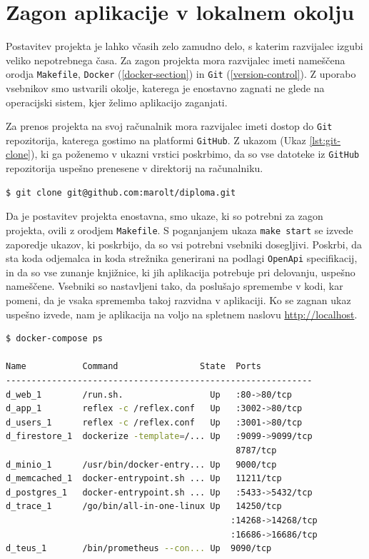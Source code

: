 \documentclass[a4paper, 12pt]{book}
\begin{document}
\section{Zagon aplikacije v lokalnem okolju}
Postavitev projekta je lahko včasih zelo zamudno delo, s katerim razvijalec izgubi veliko nepotrebnega časa. Za zagon projekta mora razvijalec imeti nameščena orodja \verb=Makefile=, \verb=Docker= (\ref{docker-section}) in \verb=Git= (\ref{version-control}). Z uporabo vsebnikov smo ustvarili okolje, katerega je enostavno zagnati ne glede na operacijski sistem, kjer želimo aplikacijo zaganjati.

Za prenos projekta na svoj računalnik mora razvijalec imeti dostop do \verb=Git= repozitorija, katerega gostimo na platformi \verb=GitHub=. Z ukazom (Ukaz \ref{lst:git-clone}), ki ga poženemo v ukazni vrstici poskrbimo, da so vse datoteke iz \verb=GitHub= repozitorija uspešno prenesene v direktorij na računalniku.

\begin{lstlisting}[language=bash,style=mystyle,caption={Ukaz za prenos datotek iz GitHub repozitorija},label=lst:git-clone]
$ git clone git@github.com:marolt/diploma.git
\end{lstlisting}

Da je postavitev projekta enostavna, smo ukaze, ki so potrebni za zagon projekta, ovili z orodjem \verb=Makefile=. S poganjanjem ukaza \verb=make start= se izvede zaporedje ukazov, ki poskrbijo, da so vsi potrebni vsebniki dosegljivi. Poskrbi, da sta koda odjemalca in koda strežnika generirani na podlagi \verb=OpenApi= specifikacij, in da so vse zunanje knjižnice, ki jih aplikacija potrebuje pri delovanju, uspešno nameščene. Vsebniki so nastavljeni tako, da poslušajo spremembe v kodi, kar pomeni, da je vsaka sprememba takoj razvidna v aplikaciji. Ko se zagnan ukaz uspešno izvede, nam je aplikacija na voljo na spletnem naslovu \url{http://localhost}.


\begin{lstlisting}[language=bash,style=mystyle,caption={Prikaz zagnanih vsebnikov.},label=lst:running-containers]
$ docker-compose ps

Name           Command                State  Ports
------------------------------------------------------------
d_web_1        /run.sh.                 Up   :80->80/tcp
d_app_1        reflex -c /reflex.conf   Up   :3002->80/tcp
d_users_1      reflex -c /reflex.conf   Up   :3001->80/tcp 
d_firestore_1  dockerize -template=/... Up   :9099->9099/tcp             
                                             8787/tcp
d_minio_1      /usr/bin/docker-entry... Up   9000/tcp     
d_memcached_1  docker-entrypoint.sh ... Up   11211/tcp     
d_postgres_1   docker-entrypoint.sh ... Up   :5433->5432/tcp       
d_trace_1      /go/bin/all-in-one-linux Up   14250/tcp 
                                            :14268->14268/tcp
                                            :16686->16686/tcp
d_teus_1       /bin/prometheus --con... Up  9090/tcp     
\end{lstlisting}
\end{document}
